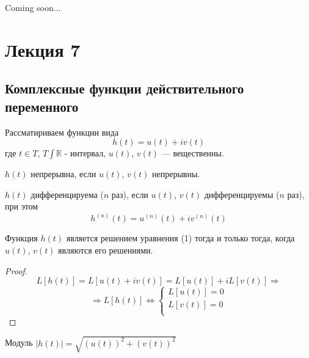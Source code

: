 Coming soon...

\section{Лекция 7}


\subsection{Комплексные функции действительного переменного}
Рассматириваем функции вида 
\[ h(t) = u(t) + iv(t) \]
где $t \in T$, $T \int \mathbb{R}$ - интервал, $u(t)$, $v(t)$ --- вещественны.
\begin{df} 
$h(t)$ непрерывна, если $u(t)$, $v(t)$ непрерывны. 
\end{df}
\begin{df}
$h(t)$ дифференцируема ($n$ раз), если $u(t)$, $v(t)$ дифференцируемы ($n$ раз), при этом
\[ h^{(n)}(t) = u^{(n)}(t) + iv^{(n)}(t)\]
\end{df}

\begin{lem}
Функция $h(t)$ является решением уравнения (1) тогда и только тогда, когда $u(t)$, $v(t)$ являются его решениями.
\end{lem}
\begin{proof}
\[ L[h(t)] = L[u(t) + iv(t)] = L[u(t)] + iL[v(t)] \Rightarrow \]
\[ \Rightarrow L[h(t)] \Leftrightarrow \begin{cases}
L[u(t)] = 0 \\
L[v(t)] = 0 \\
\end{cases}\]
\end{proof}

\begin{df}
Модуль $|h(t)| = \sqrt{(u(t))^2 + (v(t))^2}$
\end{df}


